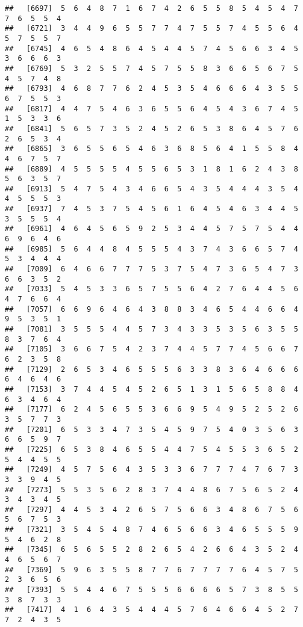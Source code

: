 \documentclass[
]{book}
\begin{document}
\begin{verbatim}
##   [6697]  5  6  4  8  7  1  6  7  4  2  6  5  5  8  5  4  5  4  7  7  6  5  5  4
##   [6721]  3  4  4  9  6  5  5  7  7  4  7  5  5  7  4  5  5  6  4  5  7  5  5  7
##   [6745]  4  6  5  4  8  6  4  5  4  4  5  7  4  5  6  6  3  4  5  3  6  6  6  3
##   [6769]  5  3  2  5  5  7  4  5  7  5  5  8  3  6  6  5  6  7  5  4  5  7  4  8
##   [6793]  4  6  8  7  7  6  2  4  5  3  5  4  6  6  6  4  3  5  5  6  7  5  5  3
##   [6817]  4  4  7  5  4  6  3  6  5  5  6  4  5  4  3  6  7  4  5  1  5  3  3  6
##   [6841]  5  6  5  7  3  5  2  4  5  2  6  5  3  8  6  4  5  7  6  2  6  5  3  4
##   [6865]  3  6  5  5  6  5  4  6  3  6  8  5  6  4  1  5  5  8  4  4  6  7  5  7
##   [6889]  4  5  5  5  5  4  5  5  6  5  3  1  8  1  6  2  4  3  8  5  6  3  5  7
##   [6913]  5  4  7  5  4  3  4  6  6  5  4  3  5  4  4  4  3  5  4  4  5  5  5  3
##   [6937]  7  4  5  3  7  5  4  5  6  1  6  4  5  4  6  3  4  4  5  3  5  5  5  4
##   [6961]  4  6  4  5  6  5  9  2  5  3  4  4  5  7  5  7  5  4  4  6  9  6  4  6
##   [6985]  5  6  4  4  8  4  5  5  5  4  3  7  4  3  6  6  5  7  4  5  3  4  4  4
##   [7009]  6  4  6  6  7  7  7  5  3  7  5  4  7  3  6  5  4  7  3  6  6  3  5  2
##   [7033]  5  4  5  3  3  6  5  7  5  5  6  4  2  7  6  4  4  5  6  4  7  6  6  4
##   [7057]  6  6  9  6  4  6  4  3  8  8  3  4  6  5  4  4  6  6  4  9  5  3  5  1
##   [7081]  3  5  5  5  4  4  5  7  3  4  3  3  5  3  5  6  3  5  5  8  3  7  6  4
##   [7105]  3  6  6  7  5  4  2  3  7  4  4  5  7  7  4  5  6  6  7  6  2  3  5  8
##   [7129]  2  6  5  3  4  6  5  5  5  6  3  3  8  3  6  4  6  6  6  6  4  6  4  6
##   [7153]  3  7  4  4  5  4  5  2  6  5  1  3  1  5  6  5  8  8  4  6  3  4  6  4
##   [7177]  6  2  4  5  6  5  5  3  6  6  9  5  4  9  5  2  5  2  6  3  5  7  7  3
##   [7201]  6  5  3  3  4  7  3  5  4  5  9  7  5  4  0  3  5  6  3  6  6  5  9  7
##   [7225]  6  5  3  8  4  6  5  5  4  4  7  5  4  5  5  3  6  5  2  5  4  4  5  5
##   [7249]  4  5  7  5  6  4  3  5  3  3  6  7  7  7  4  7  6  7  3  3  3  9  4  5
##   [7273]  5  5  3  5  6  2  8  3  7  4  4  8  6  7  5  6  5  2  4  3  4  3  4  5
##   [7297]  4  4  5  3  4  2  6  5  7  5  6  6  3  4  8  6  7  5  6  5  6  7  5  3
##   [7321]  3  5  4  5  4  8  7  4  6  5  6  6  3  4  6  5  5  5  9  5  4  6  2  8
##   [7345]  6  5  6  5  5  2  8  2  6  5  4  2  6  6  4  3  5  2  4  4  6  5  6  7
##   [7369]  5  9  6  3  5  5  8  7  7  6  7  7  7  7  6  4  5  7  5  2  3  6  5  6
##   [7393]  5  5  4  4  6  7  5  5  5  6  6  6  6  5  7  3  8  5  5  3  8  7  3  3
##   [7417]  4  1  6  4  3  5  4  4  4  5  7  6  4  6  6  4  5  2  7  7  2  4  3  5

\end{verbatim}
\end{document}
